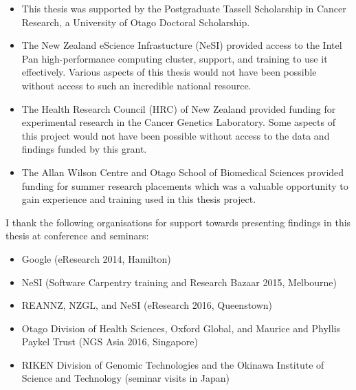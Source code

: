 \begin{small}
 
\begin{itemize}
\item
This thesis was supported by the Postgraduate Tassell Scholarship in Cancer Research, a University of Otago Doctoral Scholarship.

\item
The New Zealand eScience Infrastucture (NeSI) provided access to the Intel Pan high-performance computing cluster, support, and training to use it effectively. Various aspects of this thesis would not have been possible without access to such an incredible national resource. 

\item
The Health Research Council (HRC) of New Zealand provided funding for experimental research in the Cancer Genetics Laboratory. Some aspects of this project would not have been possible without access to the data and findings funded by this grant.

\item
The Allan Wilson Centre and Otago School of Biomedical Sciences provided funding for summer research placements which was a valuable opportunity to gain experience and training used in this thesis project.

\end{itemize}

\end{small}


I thank the following organisations for support towards presenting findings in this thesis at conference and seminars:

\begin{small}

\begin{itemize}

\item
Google (eResearch 2014, Hamilton)

\item
NeSI (Software Carpentry training and Research Bazaar 2015, Melbourne)

\item
REANNZ, NZGL, and NeSI (eResearch 2016, Queenstown)

\item
Otago Division of Health Sciences, Oxford Global, and Maurice and Phyllis Paykel Trust (NGS Asia 2016, Singapore)

\item
RIKEN Division of Genomic Technologies and the Okinawa Institute of Science and Technology (seminar visits in Japan)

\end{itemize}

\end{small}

